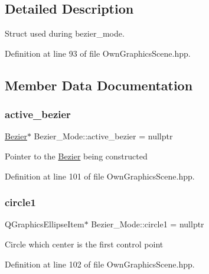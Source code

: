 \subsection{Detailed Description}
Struct used during bezier\+\_\+mode. 

Definition at line 93 of file Own\+Graphics\+Scene.\+hpp.



\subsection{Member Data Documentation}
\mbox{\label{structBezier__Mode_a9aefbd869ef59854732e405886d334fb}} 
\subsubsection{\texorpdfstring{active\+\_\+bezier}{active\_bezier}}
{\footnotesize\ttfamily \mbox{\hyperlink{classBezier}{Bezier}}$\ast$ Bezier\+\_\+\+Mode\+::active\+\_\+bezier = nullptr}

Pointer to the \mbox{\hyperlink{classBezier}{Bezier}} being constructed 

Definition at line 101 of file Own\+Graphics\+Scene.\+hpp.

\mbox{\label{structBezier__Mode_ab07833315488dc0d3c6f613c51de1d3f}} 
\subsubsection{\texorpdfstring{circle1}{circle1}}
{\footnotesize\ttfamily Q\+Graphics\+Ellipse\+Item$\ast$ Bezier\+\_\+\+Mode\+::circle1 = nullptr}

Circle which center is the first control point 

Definition at line 102 of file Own\+Graphics\+Scene.\+hpp.

\mbox{\label{structBezier__Mode_a3f6f2bdade3db15c0855820d86a5b98e}} 
